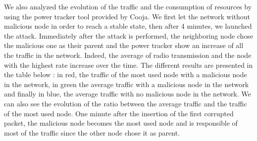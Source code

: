\documentclass{report}
\begin{document}
We also analyzed the evolution of the traffic and the consumption of resources by using the power tracker tool provided by Cooja. We first let the network without malicious node in order to reach a stable state, then after 4 minutes, we launched the attack. Immediately after the attack is performed, the neighboring node chose the malicious one as their parent and the power tracker show an increase of all the traffic in the network. Indeed, the average of radio transmission and the node with the highest rate increase over the time. The different results are presented in the table below : in red, the traffic of the most used node with a malicious node in the network, in green the average traffic with a malicious node in the network and finally in blue, the average traffic with no malicious node in the network. We can also see the evolution of the ratio between the average traffic and the traffic of the most used node. One minute after the insertion of the first corrupted packet, the malicious node becomes the most used node and is responsible of most of the traffic since the other node chose it as parent. 


\end{document}
